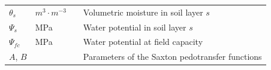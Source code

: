 \documentclass[]{book}
\begin{document}
\begin{longtable}[]{@{}llll@{}}
\begin{minipage}[t]{0.11\columnwidth}
\(\theta_s\)\strut
\end{minipage} & \begin{minipage}[t]{0.10\columnwidth}\raggedright
\(m^3 \cdot m^{-3}\)\strut
\end{minipage} & \begin{minipage}[t]{0.12\columnwidth}\raggedright
\strut
\end{minipage} & \begin{minipage}[t]{0.45\columnwidth}\raggedright
Volumetric moisture in soil layer \(s\)\strut
\end{minipage}\tabularnewline
\begin{minipage}[t]{0.11\columnwidth}\raggedright
\(\Psi_s\)\strut
\end{minipage} & \begin{minipage}[t]{0.10\columnwidth}\raggedright
MPa\strut
\end{minipage} & \begin{minipage}[t]{0.12\columnwidth}\raggedright
\strut
\end{minipage} & \begin{minipage}[t]{0.45\columnwidth}\raggedright
Water potential in soil layer \(s\)\strut
\end{minipage}\tabularnewline
\begin{minipage}[t]{0.11\columnwidth}\raggedright
\(\Psi_{fc}\)\strut
\end{minipage} & \begin{minipage}[t]{0.10\columnwidth}\raggedright
MPa\strut
\end{minipage} & \begin{minipage}[t]{0.12\columnwidth}\raggedright
\strut
\end{minipage} & \begin{minipage}[t]{0.45\columnwidth}\raggedright
Water potential at field capacity\strut
\end{minipage}\tabularnewline
\begin{minipage}[t]{0.11\columnwidth}\raggedright
\(A\), \(B\)\strut
\end{minipage} & \begin{minipage}[t]{0.10\columnwidth}\raggedright
\strut
\end{minipage} & \begin{minipage}[t]{0.12\columnwidth}\raggedright
\strut
\end{minipage} & \begin{minipage}[t]{0.45\columnwidth}\raggedright
Parameters of the Saxton pedotransfer functions\strut
\end{minipage}\tabularnewline

\end{longtable}
\end{document}

